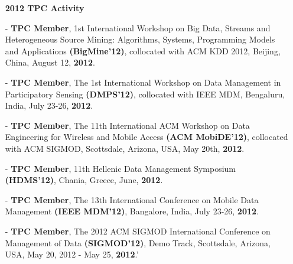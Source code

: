 \documentclass[10pt]{article}
\begin{document}
\begin{itemize}
\begin{itemize}
%
\vspace{0.1in}
\item[]{\bf 2012 TPC Activity\hrulefill }
%
\item[-] {\bf TPC Member}, 1st International Workshop on Big Data, Streams and Heterogeneous Source Mining: Algorithms, Systems, Programming Models and Applications {\bf (BigMine'12)}, collocated with ACM KDD 2012, Beijing, China, August 12, {\bf 2012}.
\item[-] {\bf TPC Member}, The 1st International Workshop on Data Management in Participatory Sensing {\bf (DMPS'12)}, collocated with IEEE MDM, Bengaluru, India, July 23-26, {\bf 2012}.
\item[-] {\bf TPC Member}, The 11th International ACM Workshop on Data Engineering for Wireless and Mobile Access {\bf (ACM MobiDE'12)}, collocated with ACM SIGMOD, Scottsdale, Arizona, USA, May 20th, {\bf 2012}.
\item[-] {\bf TPC Member}, 11th Hellenic Data Management Symposium {\bf (HDMS'12)}, Chania, Greece, June, {\bf 2012}.
\item[-] {\bf TPC Member}, The 13th International Conference on Mobile Data Management {\bf (IEEE MDM'12)}, Bangalore, India, July 23-26, {\bf 2012}.
\item[-] {\bf TPC Member}, The 2012 ACM SIGMOD International Conference on Management of Data {\bf (SIGMOD'12)}, Demo Track, Scottsdale, Arizona, USA, May 20, 2012 - May 25, {\bf 2012}.'


\end{itemize}
\end{itemize}
\end{document}
